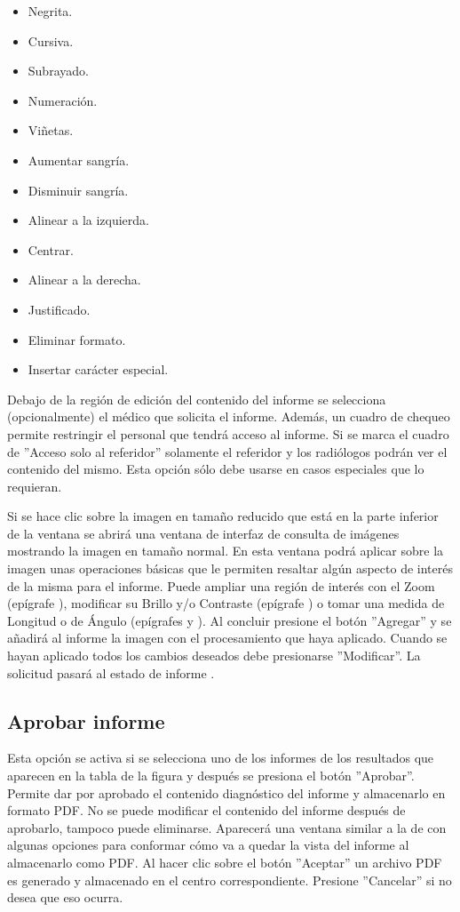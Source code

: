 \documentclass{plantilla-manual-usuario}
\begin{document}
\begin{itemize}
\item Negrita.
\item Cursiva.
\item Subrayado.
\item Numeración.
\item Viñetas.
\item Aumentar sangría.
\item Disminuir sangría. 
\item Alinear a la izquierda.
\item Centrar.
\item Alinear a la derecha.
\item Justificado. 
\item Eliminar formato. 
\item Insertar carácter especial. 
\end{itemize}

Debajo de la región de edición del contenido del informe se selecciona (opcionalmente) el médico que solicita el informe. Además, un cuadro de chequeo permite restringir el personal que tendrá acceso al informe. Si se marca el cuadro de ”Acceso solo al referidor”  solamente el referidor y los radiólogos podrán ver el contenido del mismo. Esta opción sólo debe usarse en casos especiales que lo requieran.

Si se hace clic sobre la imagen en tamaño reducido que está en la parte inferior de la ventana se abrirá una ventana de interfaz de consulta de imágenes mostrando la imagen en tamaño normal. En esta ventana podrá aplicar sobre la imagen unas operaciones básicas que le permiten resaltar algún aspecto de interés de la misma para el informe. Puede ampliar una región de interés con el Zoom (epígrafe ), modificar su Brillo y/o Contraste (epígrafe ) o tomar una medida de Longitud o de Ángulo (epígrafes  y ). Al concluir presione el botón ”Agregar” y se añadirá al informe la imagen con el procesamiento que haya aplicado. Cuando se hayan aplicado todos los cambios deseados debe presionarse ”Modificar”. La solicitud pasará al estado de informe .

\subsection{Aprobar informe}\label{subsectionAprobarInforme}
Esta opción se activa si se selecciona uno de los informes de los resultados que aparecen en la tabla de la figura  y después se presiona el botón ”Aprobar”. Permite dar por aprobado el contenido diagnóstico del informe y almacenarlo en formato PDF. No se puede modificar el contenido del informe después de aprobarlo, tampoco puede eliminarse. Aparecerá una ventana similar a la de  con algunas opciones para conformar cómo va  a quedar la vista del informe al almacenarlo como PDF. Al hacer clic sobre el botón ”Aceptar” un archivo PDF es generado y almacenado en el centro correspondiente. Presione ”Cancelar” si no desea que eso ocurra.
\end{document}
